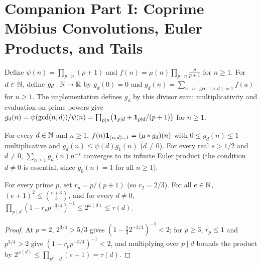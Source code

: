 \section{Companion Part I: Coprime M\"obius Convolutions, Euler Products, and Tails}
\label{sec:companion-mobius}

\begin{definition}
\label{def:coprime-kernel}
\leanok
Define $\psi(n) = \prod_{p \mid n}(p + 1)$ and $f(n) = \mu(n)\prod_{p \mid n}\frac{p}{p + 1}$ for $n \ge 1$. For $d \in \mathbb{N}$, define $g_d : \mathbb{N} \to \mathbb{R}$ by $g_d(0) = 0$ and $g_d(n) = \sum_{a \mid n,\, \gcd(a, d) = 1} f(a)$ for $n \ge 1$. The implementation defines $g_d$ by this divisor sum; multiplicativity and evaluation on prime powers give $g_d(n) = \psi(\gcd(n, d)) / \psi(n) = \prod_{p \mid n} \bigl(\mathbf{1}_{p \mid d} + \mathbf{1}_{p \nmid d}/(p+1)\bigr)$ for $n \ge 1$.
\end{definition}

\begin{theorem}
\label{thm:coprime-euler}
\leanok
For every $d \in \mathbb{N}$ and $n \ge 1$, $f(n)\mathbf{1}_{(n,d)=1} = (\mu * g_d)(n)$ with $0 \le g_d(n) \le 1$ multiplicative and $g_d(n) \le \psi(d) g_1(n)$ ($d \ne 0$). For every real $s > 1/2$ and $d \ne 0$, $\sum_{n \ge 1} g_d(n)n^{-s}$ converges to its infinite Euler product (the condition $d \ne 0$ is essential, since $g_0(n) = 1$ for all $n \ge 1$).
\end{theorem}

\begin{theorem}[Modulus-uniform $s = 3/4$ local Euler-factor bound]
\label{thm:euler-ratio}
\leanok
For every prime $p$, set $r_p = p / (p + 1)$ (so $r_2 = 2/3$). For all $e \in \mathbb{N}$, $(e+1)^2 \le \binom{e+3}{3}$, and for every $d \ne 0$, $\prod_{p \mid d} (1 - r_p p^{-3/4})^{-1} \le 2^{\omega(d)} \le \tau(d)$.
\end{theorem}

\begin{proof}
At $p = 2$, $2^{3/4} > 5/3$ gives $(1 - \frac{2}{3} 2^{-3/4})^{-1} < 2$; for $p \ge 3$, $r_p \le 1$ and $p^{3/4} > 2$ give $(1 - r_p p^{-3/4})^{-1} < 2$, and multiplying over $p \mid d$ bounds the product by $2^{\omega(d)} \le \prod_{p^e \parallel d} (e + 1) = \tau(d)$.
\end{proof}

